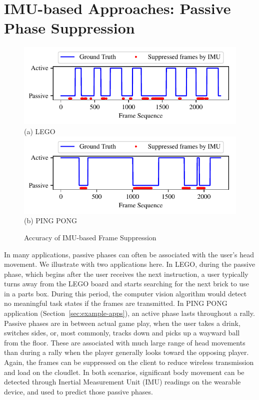 \section{IMU-based Approaches: Passive Phase Suppression}

\begin{figure}[h]
\begin{center}
\includegraphics[width=.9\linewidth]{FIGS/fig-imu-trace-lego.pdf}\\
{(a) LEGO}
\includegraphics[width=.9\linewidth]{FIGS/fig-imu-trace-pingpong.pdf}\\
{(b) PING PONG}
\end{center}
\vspace{-0.1in}
\caption{Accuracy of IMU-based Frame Suppression}
\label{fig:imu-trace-example}
\vspace{-0.1in}
\end{figure}

In many applications, passive phases can often be associated with the user's
head movement. We illustrate with two applications here. In LEGO, during the
passive phase, which begins after the user receives the next instruction, a user
typically turns away from the LEGO board and starts searching for the next brick
to use in a parts box. During this period, the computer vision algorithm would
detect no meaningful task states if the frames are transmitted.  In PING PONG
application (Section~\ref{sec:example-apps}), an active phase lasts
throughout a rally.  Passive phases are in between actual game play, when the
user takes a drink, switches sides, or, most commonly, tracks down and picks up
a wayward ball from the floor. These are associated with much large range of
head movements than during a rally when the player generally looks toward the
opposing player.  Again, the frames can be suppressed on the client to reduce
wireless transmission and load on the cloudlet.  In both scenarios, significant
body movement can be detected through Inertial Measurement Unit (IMU) readings
on the wearable device, and used to predict those passive phases.


